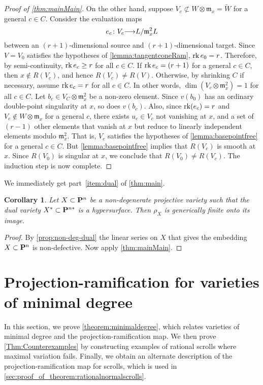\documentclass[11pt,reqno]{amsart}
\theoremstyle{plain}
\newtheorem{corollary}[theorem]{Corollary}
\theoremstyle{definition}
\theoremstyle{remark}
\numberwithin{equation}{section}
\renewcommand{\to}{{\longrightarrow}}
\numberwithin{equation}{section}
\begin{document}
\begin{proof}[Proof of \autoref{thm:mainMain}]
  On the other hand, suppose $V_c \not \subset W \otimes \mathfrak m_x = \widetilde W$ for a general $c \in C$.
  Consider the evaluation maps
  \[ e_c \from V_c \to L / \mathfrak m_x^2 L \]
  between an $(r+1)$-dimensional source and $(r+1)$-dimensional target.
  Since $V = V_0$ satisfies the hypotheses of \autoref{lemma:tangentconeRam}, $\rk e_0 = r$.
  Therefore, by semi-continuity, $\rk e_c \geq r$ for all $c \in C$.
  If $\rk e_c = (r+1)$ for a general $c \in C$, then $x \not \in R(V_c)$, and hence $R(V_c) \neq R(V)$.
  Otherwise, by shrinking $C$ if necessary, assume $\rk e_c = r$ for all $c \in C$.
  In other words, $\dim (V_c \otimes \mathfrak m_x^2) = 1$ for all $c \in C$.
  Let $b_c \in V_C \otimes \mathfrak m_x^2$ be a non-zero element.
  Since $v(b_0)$ has an ordinary double-point singularity at $x$, so does $v(b_c)$.
  Also, since $\rk (e_c) = r$ and $V_c \not \in W \otimes \mathfrak m_x$ for a general $c$, there exists $u_c \in V_c$ not vanishing at $x$, and a set of $(r-1)$ other elements that vanish at $x$ but reduce to linearly independent elements modulo $\mathfrak m_x^2$.
  That is, $V_c$ satisfies the hypotheses of \autoref{lemma:basepointfree} for a general $c \in C$.
  But \autoref{lemma:basepointfree} implies that $R(V_c)$ is smooth at $x$.
  Since $R(V_0)$ is singular at $x$, we conclude that $R(V_0) \neq R(V_c)$.
  The induction step is now complete.
\end{proof}

We immediately get part~\eqref{item:dual} of \autoref{thm:main}.
\begin{corollary}
  \label{cor:maintheorem} Let $X \subset \P^{n}$ be a non-degenerate projective variety such that the dual variety $X^{*} \subset \P^{n*}$ is a hypersurface. Then $\rho_{X}$ is generically finite onto its image.
\end{corollary}
\begin{proof}
  By \autoref{prop:non-deg-dual} the linear series on $X$ that gives the embedding $X \subset \P^n$ is non-defective.
  Now apply \autoref{thm:mainMain}.
\end{proof}


\section{Projection-ramification for varieties of minimal degree}\label{sec:minimaldegree}
In this section, we prove \autoref{theorem:minimaldegree}, which relates varieties of minimal degree and the projection-ramification map.
We then prove \autoref{Thm:Counterexamples} by constructing examples of rational scrolls where maximal variation fails.
Finally, we obtain an alternate description of the projection-ramification map for scrolls, which is used in \autoref{sec:proof_of_theorem:rationalnormalscrolls}.
\end{document}
